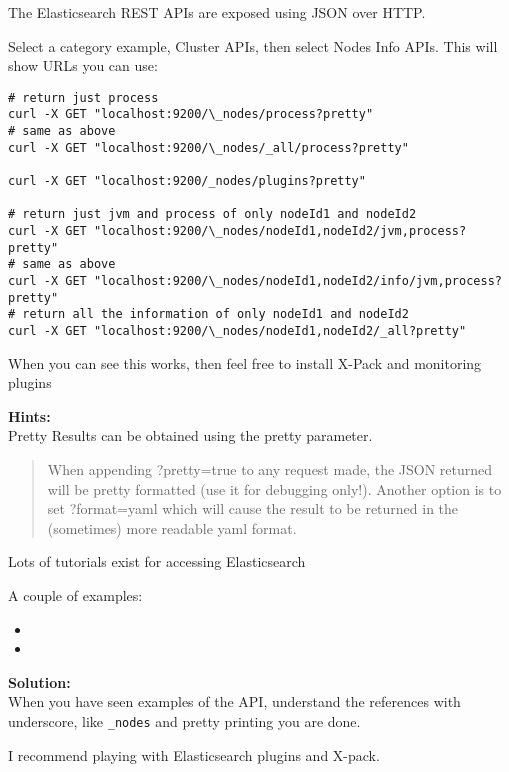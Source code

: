 \documentclass[a4paper,11pt,notitlepage]{report}
\begin{document}
The Elasticsearch REST APIs are exposed using JSON over HTTP.

Select a category example, Cluster APIs, then select Nodes Info APIs. This will show URLs you can use:

\begin{verbatim}
# return just process
curl -X GET "localhost:9200/\_nodes/process?pretty"
# same as above
curl -X GET "localhost:9200/\_nodes/_all/process?pretty"

curl -X GET "localhost:9200/_nodes/plugins?pretty"

# return just jvm and process of only nodeId1 and nodeId2
curl -X GET "localhost:9200/\_nodes/nodeId1,nodeId2/jvm,process?pretty"
# same as above
curl -X GET "localhost:9200/\_nodes/nodeId1,nodeId2/info/jvm,process?pretty"
# return all the information of only nodeId1 and nodeId2
curl -X GET "localhost:9200/\_nodes/nodeId1,nodeId2/_all?pretty"
\end{verbatim}

When you can see this works, then feel free to install X-Pack and monitoring plugins

{\bf Hints:}\\
Pretty Results can be obtained using the pretty parameter.
\begin{quote}
When appending ?pretty=true to any request made, the JSON returned will be pretty formatted (use it for debugging only!). Another option is to set ?format=yaml which will cause the result to be returned in the (sometimes) more readable yaml format.
\end{quote}

Lots of tutorials exist for accessing Elasticsearch

A couple of examples:
\begin{itemize}
\item {}
\item {}
\end{itemize}

{\bf Solution:}\\
When you have seen examples of the API, understand the references with underscore, like \verb+_nodes+ and pretty printing you are done.

I recommend playing with Elasticsearch plugins and X-pack.\\
\end{document}
